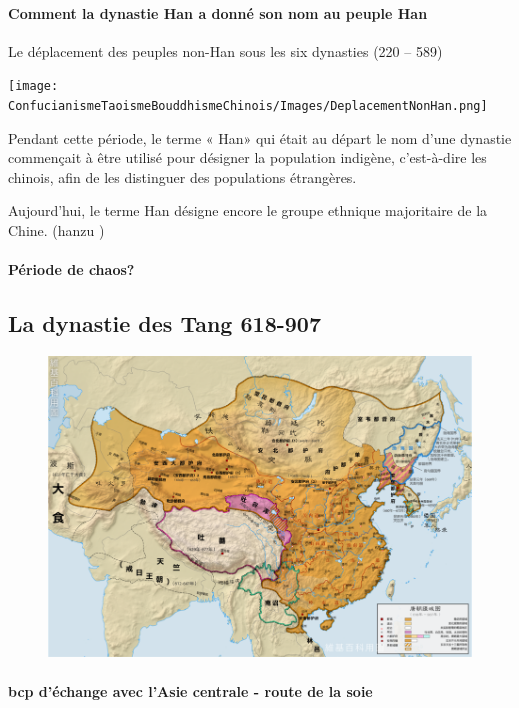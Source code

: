 \paragraph{Comment la dynastie Han a donné son nom au peuple Han} Le déplacement des peuples non-Han sous les six dynasties (220 – 589)
\begin{marginfigure}
    \texttt{[image: ConfucianismeTaoismeBouddhismeChinois/Images/DeplacementNonHan.png]}
\end{marginfigure}
Pendant cette période, le terme « Han»  qui était au départ le nom d’une dynastie commençait à être utilisé pour désigner la population indigène, c’est-à-dire les chinois, afin de les distinguer des populations étrangères.

Aujourd’hui, le terme Han désigne encore le groupe ethnique majoritaire de la Chine. (hanzu  )
\paragraph{Période de chaos?
}

\subsection{La dynastie des Tang 618-907}
\begin{figure}
    \centering
    \includegraphics[width=\textwidth]{ConfucianismeTaoismeBouddhismeChinois/Images/CarteTang.png}

    \label{fig:enter-label}
\end{figure}
\paragraph{bcp d'échange avec l'Asie centrale - route de la soie}

